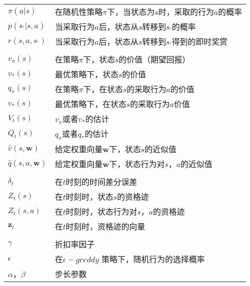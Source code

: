 \begin{longtable}{p{2cm}p{11cm}}
$\pi(a|s)$      & 在随机性策略$\pi$下，当状态为$s$时，采取的行为$a$的概率                 \\
$p(s_{'}|s,a)$      & 当采取行为$a$后，状态从$s$转移到$s_{'}$的概率  \\
$r(s,a,s_{'})$      &   当采取行为$a$后，状态从$s$转移到$s_{'}$得到的即时奖赏\\
                            &                                         \\
$v_{\pi}(s)$     & 在策略$\pi$下，状态$s$的价值（期望回报）             \\
$v_{*}(s)$     & 最优策略下，状态$s$的价值    \\
$q_{\pi}(s)$     & 在策略$\pi$下，在状态$s$的采取行为$a$的价值             \\
$v_{*}(s)$     & 最优策略下，在状态$s$的采取行为$a$价值    \\
$V_{t}(s)$     & $v_{\pi}$或者$v_{*}$的估计             \\
$Q_{t}(s)$     & $q_{\pi}$或者$q_{*}$的估计    \\
$\hat{v}(s,\bm{w})$     & 给定权重向量$\bm{w}$下，状态$s$的近似值         \\
$\hat{q}(s,a,\bm{w})$     & 给定权重向量$\bm{w}$下，状态行为对$s$，$a$的近似值     \\
                            &                                         \\
$\delta_{t}$     & 在$t$时刻的时间差分误差    \\
$Z_{t}(s)$     &  在$t$时刻时，状态$s$的资格迹             \\
$Z_{t}(s,a)$     & 在$t$时刻时，状态行为对$s$，$a$的资格迹    \\
$\bm{z}_{t}$     & 在$t$时刻时，资格迹的向量    \\
                            &                                         \\
$\gamma$     & 折扣率因子    \\
$\epsilon$     & 在$\epsilon-greddy$ 策略下，随机行为的选择概率         \\
$\alpha$，$\beta$     & 步长参数  \\

\end{longtable}



